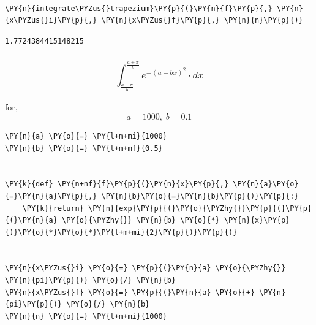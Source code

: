     \begin{center}
    \end{center}
    { \hspace*{\fill} \\}
    
    \begin{tcolorbox}[breakable, size=fbox, boxrule=1pt, pad at break*=1mm,colback=cellbackground, colframe=cellborder]
\begin{Verbatim}[commandchars=\\\{\}]
\PY{n}{integrate\PYZus{}trapezium}\PY{p}{(}\PY{n}{f}\PY{p}{,} \PY{n}{x\PYZus{}i}\PY{p}{,} \PY{n}{x\PYZus{}f}\PY{p}{,} \PY{n}{n}\PY{p}{)}
\end{Verbatim}
\end{tcolorbox}

            \begin{tcolorbox}[breakable, size=fbox, boxrule=.5pt, pad at break*=1mm, opacityfill=0]
\begin{Verbatim}[commandchars=\\\{\}]
1.7724384415148215
\end{Verbatim}
\end{tcolorbox}
        
    \hypertarget{int_fraca-pibfracapib-e-a-bx2-cdot-dx}{%
\subsubsection{\texorpdfstring{\[\int_{\frac{a-\pi}{b}}^{\frac{a+\pi}{b}} e^{-(a-bx)^2} \cdot dx\]}{\textbackslash int\_\{\textbackslash frac\{a-\textbackslash pi\}\{b\}\}\^{}\{\textbackslash frac\{a+\textbackslash pi\}\{b\}\} e\^{}\{-(a-bx)\^{}2\} \textbackslash cdot dx}}\label{int_fraca-pibfracapib-e-a-bx2-cdot-dx}}

for, \[a = 1000, \; b = 0.1\]

    \begin{tcolorbox}[breakable, size=fbox, boxrule=1pt, pad at break*=1mm,colback=cellbackground, colframe=cellborder]
\begin{Verbatim}[commandchars=\\\{\}]
\PY{n}{a} \PY{o}{=} \PY{l+m+mi}{1000}
\PY{n}{b} \PY{o}{=} \PY{l+m+mf}{0.5}


\PY{k}{def} \PY{n+nf}{f}\PY{p}{(}\PY{n}{x}\PY{p}{,} \PY{n}{a}\PY{o}{=}\PY{n}{a}\PY{p}{,} \PY{n}{b}\PY{o}{=}\PY{n}{b}\PY{p}{)}\PY{p}{:}
    \PY{k}{return} \PY{n}{exp}\PY{p}{(}\PY{o}{\PYZhy{}}\PY{p}{(}\PY{p}{(}\PY{n}{a} \PY{o}{\PYZhy{}} \PY{n}{b} \PY{o}{*} \PY{n}{x}\PY{p}{)}\PY{o}{*}\PY{o}{*}\PY{l+m+mi}{2}\PY{p}{)}\PY{p}{)}


\PY{n}{x\PYZus{}i} \PY{o}{=} \PY{p}{(}\PY{n}{a} \PY{o}{\PYZhy{}} \PY{n}{pi}\PY{p}{)} \PY{o}{/} \PY{n}{b}
\PY{n}{x\PYZus{}f} \PY{o}{=} \PY{p}{(}\PY{n}{a} \PY{o}{+} \PY{n}{pi}\PY{p}{)} \PY{o}{/} \PY{n}{b}
\PY{n}{n} \PY{o}{=} \PY{l+m+mi}{1000}
\end{Verbatim}
\end{tcolorbox}

